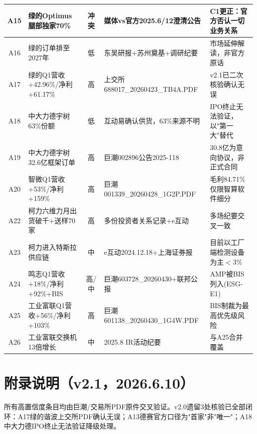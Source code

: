 \begin{longtable}{c L{3.2cm} c L{4cm} L{4.5cm}}
\midrule
A15 & 绿的Optimus腿部独家70\% & \textcolor{riskred}{冲突} & 媒体vs官方2025.6/12澄清公告 & C1更正：官方否认一切业务关系 \\
\midrule
A16 & 绿的订单排至2027年 & \textcolor{riskamber}{低} & 东吴研报+苏州奠基+调研纪要 & 市场延伸解读，非官方原话 \\
\midrule
A17 & 绿的Q1营收+42.96\%/净利+61.17\% & \textcolor{riskgreen}{高} & 上交所688017\_20260423\_TB4A.PDF & v2.1已二次核验确认无误 \\
\midrule
A18 & 中大力德宇树63\%份额 & \textcolor{riskred}{低} & 互动易确认供货，63\%来源不明 & IPO终止无法验证，以"第一大"替代 \\
\midrule
A19 & 中大力德宇树32.6亿框架订单 & \textcolor{riskgreen}{高} & 巨潮002896公告2025-118 & 30.8亿为意向协议，非正式合同 \\
\midrule
A20 & 智微Q1营收+53\%/净利+159\% & \textcolor{riskgreen}{高} & 巨潮001339\_20260428\_1G2P.PDF & 毛利84.71\%仅限智算软件细分 \\
\midrule
A22 & 柯力六维力月出货破千+送样70家 & \textcolor{riskgreen}{高} & 多份投资者关系记录+e互动 & 多场纪要交叉一致 \\
\midrule
A23 & 柯力进入特斯拉供应链 & \textcolor{riskamber}{中} & e互动2024.12.18+上海证券报 & 目前以工厂端检测设备为主$<$3\% \\
\midrule
A24 & 鸣志Q1营收+18\%/净利+92\%+BIS & \textcolor{riskgreen}{高}/\textcolor{riskamber}{中} & 巨潮603728\_20260430+联邦公报 & AMP被BIS列入(ESG-E1) \\
\midrule
A25 & 工业富联Q1营收+56\%/净利+103\% & \textcolor{riskgreen}{高} & 巨潮601138\_20260430\_1G4W.PDF & BIS制裁为最高优先级风险 \\
\midrule
A26 & 工业富联交换机13倍增长 & \textcolor{riskamber}{中} & 2025.8 IR活动纪要 & 与A25合并覆盖 \\

\end{longtable}

\section*{附录说明（v2.1，2026.6.10）}

所有高置信度条目均由巨潮/交易所PDF原件交叉验证。v2.0遗留3处核验已全部闭环：A17绿的谐波上交所PDF确认无误；A13德赛官方口径为"首家"非"唯一"；A18中大力德IPO终止无法验证降级处理。
